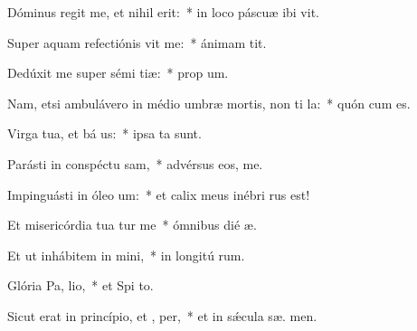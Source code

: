 \item Dóminus regit me, et nihil  erit:~* in loco páscuæ ibi  vit.
\item Super aquam refectiónis vit me:~* ánimam  tit.
\item Dedúxit me super sémi tiæ:~* prop  um.
\item Nam, etsi ambulávero in médio umbræ mortis, non ti la:~* quón  cum es.
\item Virga tua, et bá us:~* ipsa  ta sunt.
\item Parásti in conspéctu  sam,~* advérsus eos,   me.
\item Impinguásti in óleo  um:~* et calix meus inébri  rus est!
\item Et misericórdia tua tur me~* ómnibus dié  æ.
\item Et ut inhábitem in  mini,~* in longitú rum.
\item Glória Pa,  lio,~* et Spi to.
\item Sicut erat in princípio, et ,  per,~* et in sǽcula sæ. men.
